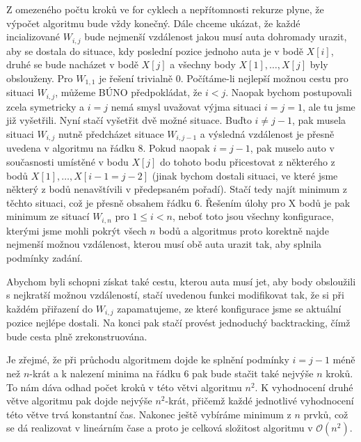 \documentclass[12pt,a4paper]{article}
\theoremstyle{plain}
\begin{document}
Z omezeného počtu kroků ve for cyklech a nepřítomnosti rekurze plyne, že výpočet algoritmu bude vždy konečný. Dále chceme ukázat, že každé incializované $ W_{i,j} $ bude nejmenší vzdálenost jakou musí auta dohromady urazit, aby se dostala do situace, kdy poslední pozice jednoho auta je v bodě $ X[i] $, druhé se bude nacházet v bodě $ X[j] $ a všechny body $X[1],\dots,X[j] $ byly obslouženy. Pro $ W_{1,1} $ je řešení trivialně 0. Počítáme-li nejlepší možnou cestu pro situaci $ W_{i,j} $, můžeme BÚNO předpokládat, že $ i < j $. Naopak bychom postupovali zcela symetricky a $ i = j $ nemá smysl uvažovat výjma situaci $ i = j = 1 $, ale tu jsme již vyšetřili. Nyní stačí vyšetřit dvě možné situace. Buďto $ i \neq j - 1$, pak musela situaci $ W_{i,j} $ nutně předcházet situace $ W_{i,j - 1} $ a výsledná vzdálenost je přesně uvedena v algoritmu na řádku 8.  Pokud naopak $ i = j - 1$, pak muselo auto v současnosti umístěné v bodu $ X[j] $ do tohoto bodu přicestovat z některého z bodů $ X[1],\dots,X[i - 1 = j -2] $ (jinak bychom dostali situaci, ve které jsme některý z bodů nenavštívili v předepsaném pořadí). Stačí tedy najít minimum z těchto situaci, což je přesně obsahem řádku 6. Řešením úlohy pro X bodů je pak minimum ze situací $ W_{i, n} $ pro $ 1 \leq i < n $, neboť toto jsou všechny konfigurace, kterými jsme mohli pokrýt všech $ n $ bodů a algoritmus proto korektně najde nejmenší možnou vzdálenost, kterou musí obě auta urazit tak, aby splnila podmínky zadání. 

Abychom byli schopni získat také cestu, kterou auta musí jet, aby body obsloužili s nejkratší možnou vzdáleností, stačí uvedenou funkci modifikovat tak, že si při každém přiřazení do $ W_{i,j} $ zapamatujeme, ze které konfigurace jsme se aktuální pozice nejlépe dostali. Na konci pak stačí provést jednoduchý backtracking, čímž bude cesta plně zrekonstruována.

Je zřejmé, že při průchodu algoritmem dojde ke splnění podmínky $ i = j - 1 $ méně než $ n $-krát a k nalezení minima na řádku 6 pak bude stačit také nejvýše $ n $ kroků. To nám dáva odhad počet kroků v této větvi algoritmu $ n^2$. K vyhodnocení druhé větve algoritmu pak dojde nejvýše $ n^2 $-krát, přičemž každé jednotlivé vyhodnocení této větve trvá konstantní čas. Nakonec ještě vybíráme minimum z $ n $ prvků, což se dá realizovat v lineárním čase a proto je celková složitost algoritmu v $\mathcal{O}(n^2) $.
\end{document}
